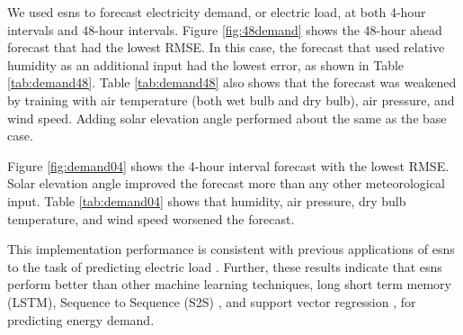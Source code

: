 We used \glspl{esn} to forecast electricity demand, or electric load, at both
4-hour intervals and 48-hour intervals. Figure \ref{fig:48demand} shows the
48-hour ahead forecast that had the lowest RMSE. In this case, the forecast
that used relative humidity as an additional input had the lowest error, as
shown in Table \ref{tab:demand48}. Table \ref{tab:demand48} also shows that the
forecast was weakened by training with air temperature (both wet bulb and dry
bulb), air pressure, and wind speed. Adding solar elevation angle performed
about the same as the base case.

Figure \ref{fig:demand04} shows the 4-hour interval forecast with the lowest
RMSE. Solar elevation angle improved the
forecast more than any other meteorological input. Table \ref{tab:demand04}
shows that humidity, air pressure, dry bulb temperature, and wind speed
worsened the forecast.

This implementation performance is consistent with previous applications
of \glspl{esn} to the task of predicting electric load
\cite{deihimi_application_2012}. Further, these results indicate that
\glspl{esn} perform better than other machine learning techniques, long
short term memory (LSTM)\cite{marino_building_2016}, Sequence to Sequence (S2S)
\cite{marino_building_2016}, and support vector regression \cite{chen_day-ahead_2017}, for predicting energy demand.

\begin{figure*}[h]
  \centering
  
  \caption{The optimized 48-hour ahead demand prediction. The inputs for this
  forecast were hourly demand and relative humidity. \textit{Hyperparameters}:
  Reservoir Size: 1500, Sparsity: 0.2, Spectral Radius: 1.5, Noise: 0.0007,
  Training Length: 5000, Prediction Window: 48, Random state: 85}
  \label{fig:48demand}
\end{figure*}

